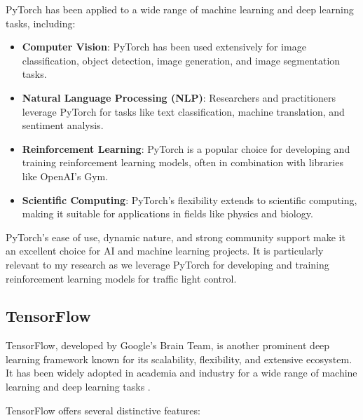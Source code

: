 PyTorch has been applied to a wide range of machine learning and deep learning tasks, including:

\begin{itemize}
    \item \textbf{Computer Vision}: PyTorch has been used extensively for image classification, object detection, image generation, and image segmentation tasks.
    
    \item \textbf{Natural Language Processing (NLP)}: Researchers and practitioners leverage PyTorch for tasks like text classification, machine translation, and sentiment analysis.
    
    \item \textbf{Reinforcement Learning}: PyTorch is a popular choice for developing and training reinforcement learning models, often in combination with libraries like OpenAI's Gym.
    
    \item \textbf{Scientific Computing}: PyTorch's flexibility extends to scientific computing, making it suitable for applications in fields like physics and biology.
\end{itemize}

PyTorch's ease of use, dynamic nature, and strong community support make it an excellent choice for AI and machine learning projects. It is particularly relevant to my research as we leverage PyTorch for developing and training reinforcement learning models for traffic light control.

\subsection{TensorFlow}

TensorFlow, developed by Google's Brain Team, is another prominent deep learning framework known for its scalability, flexibility, and extensive ecosystem. It has been widely adopted in academia and industry for a wide range of machine learning and deep learning tasks \cite{tensorflow_osdi}.

TensorFlow offers several distinctive features:

